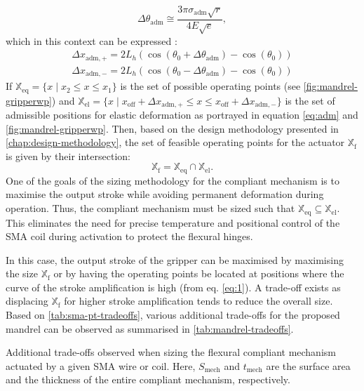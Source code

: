 \begin{equation}\label{eq:adm-theta-theory}
\Delta\theta_\text{adm} \cong \frac{3\pi\sigma_\text{adm}\sqrt{r}}{4E\sqrt{e}},
\end{equation}
which in this context can be expressed :
\begin{equation}
\begin{split}
    \Delta x_{\text{adm},+} = 2L_{h}\left(\cos(\theta_0+\Delta\theta_\text{adm})-\cos(\theta_0)\right)\\
    \Delta x_{\text{adm},-} = 2L_{h}\left(\cos(\theta_0-\Delta\theta_\text{adm}) - \cos(\theta_0)\right)
    \label{eq:adm}
\end{split}
\end{equation}
If $\mathbb{X}_\text{eq} = \{ x \;|\;  x_{2}\leqslant x \leqslant x_{1}\}$ is the set of possible operating points (see \cref{fig:mandrel-gripperwp}) and $\mathbb{X}_\text{el} =  \{ x \; | \; x_\text{off} + \Delta x_{\text{adm},+} \leqslant x \leqslant x_\text{off} + \Delta x_{\text{adm},-} \}$ is the set of admissible positions for elastic deformation as portrayed in equation \cref{eq:adm} and \cref{fig:mandrel-gripperwp}. Then, based on the design methodology presented in \cref{chap:design-methodology}, the set of feasible operating points for the actuator $\mathbb{X}_\text{f}$ is given by their intersection:
\begin{equation}
   \mathbb{X}_\text{f} = \mathbb{X}_\text{eq} \cap \mathbb{X}_\text{el}.
\end{equation}
One of the goals of the sizing methodology for the compliant mechanism is to maximise the output stroke while avoiding permanent deformation during operation. Thus, the compliant mechanism must be sized such that $\mathbb{X}_\text{eq} \subseteq \mathbb{X}_\text{el}$. This eliminates the need for precise temperature and positional control of the SMA coil during activation to protect the flexural hinges.

In this case, the output stroke of the gripper can be maximised by maximising the size $\mathbb{X}_\text{f}$ or by having the operating points be located at positions where the curve of the stroke amplification is high (from eq. \cref{eq:1}). A trade-off exists as displacing $\mathbb{X}_\text{f}$ for higher stroke amplification tends to reduce the overall size. Based on \cref{tab:sma-pt-tradeoffs}, various additional trade-offs for the proposed mandrel can be observed as summarised in \cref{tab:mandrel-tradeoffs}.

\begin{table}[hbt!]
    \centering
    \caption{Additional trade-offs observed when sizing the flexural compliant mechanism actuated by a given SMA wire or coil. Here, $S_{\text{mech}}$ and $t_{\text{mech}}$ are the surface area and the thickness of the entire compliant mechanism, respectively.}
    \label{tab:mandrel-tradeoffs}
    
\end{table}

